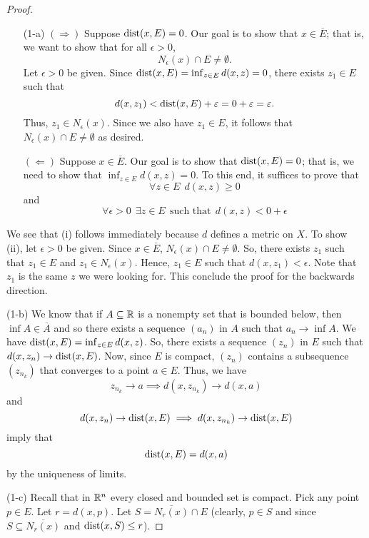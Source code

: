 \documentclass[a4paper]{article}
\begin{document}
\begin{proof}
\begin{enumerate}
    \item[(1-a)]  \( (\Longrightarrow)  \) Suppose \( \operatorname{dist}(x,E) = 0  \). Our goal is to show that \( x \in \overline{E} \); that is, we want to show that for all \( \epsilon > 0  \), 
        \[  {N}_{\epsilon}(x) \cap E \neq \emptyset. \]
        Let \( \epsilon > 0  \) be given. Since \( \operatorname{dist}(x,E) = \inf_{z \in E } d(x,z) = 0  \), there exists \( {z}_{1} \in E  \) such that 
        \[  d(x,{z}_{1}) < \operatorname{dist}(x,E) + \varepsilon = 0 + \varepsilon = \varepsilon.  \]
        Thus, \( {z}_{1} \in {N}_{\epsilon}(x) \). Since we also have \( {z}_{1} \in E  \), it follows that \( {N}_{\epsilon}(x) \cap E \neq \emptyset \) as desired.

        \( (\Longleftarrow) \) Suppose \( x \in \overline{E} \). Our goal is to show that \( \operatorname{dist}(x,E) = 0  \); that is, we need to show that \( \inf_{z \in E } d(x,z) = 0  \). To this end, it suffices to prove that 
        \[  \forall z \in E \ \ d(x,z) \geq 0 \tag{i}  \]
        and
        \[ \forall \epsilon > 0 \ \ \exists z \in E \ \ \text{such that} \ \ d(x,z) < 0 + \epsilon \tag{ii} \]
\end{enumerate}
We see that (i) follows immediately because \( d  \) defines a metric on \( X  \). To show (ii), let \( \epsilon > 0  \) be given. Since \( x \in \overline{E} \), \( {N}_{\epsilon}(x) \cap E \neq \emptyset \). So, there exists \( {z}_{1} \) such that \( {z}_{1} \in E  \) and \( {z}_{1} \in {N}_{\epsilon}(x) \). Hence, \( {z}_{1} \in E  \) such that \( d(x,{z}_{1}) < \epsilon \). Note that \( {z}_{1} \) is the same \( z  \) we were looking for. This conclude the proof for the backwards direction. 

\item[(1-b)] We know that if \( A \subseteq  \mathbb{R}   \) is a nonempty set that is bounded below, then \( \inf A \in \overline{A} \) and so there exists a sequence \( ({a}_{n})  \) in \( A  \) such that \( {a}_{n} \to \inf A  \). We have \( \operatorname{dist}(x,E) = \inf_{z \in E } d(x,z) \). So, there exists a sequence \( ({z}_{n}) \) in \( E  \) such that \( d(x,{z}_{n}) \to \operatorname{dist}(x,E) \). Now, since \( E  \) is compact, \( ({z}_{n}) \) contains a subsequence \( ({z}_{{n}_{k }}) \) that converges to a point \( a \in E  \). Thus, we have 
    \[  {z}_{{n}_{k }} \to a \implies d(x, {z}_{{n}_{k}}) \to d(x,a) \]
    and 
    \[  d(x,{z}_{n}) \to \operatorname{dist}(x,E) \implies d(x,{z}_{{n}_{k}}) \to \operatorname{dist}(x,E) \]
    imply that
    \[  \operatorname{dist}(x,E) = d(x,a) \]
    by the uniqueness of limits.
\item[(1-c)] Recall that in \( \mathbb{R}^{n} \) every closed and bounded set is compact. Pick any point \( p \in E  \). Let \( r = d(x,p) \). Let \( S = \overline{{N}_{r}(x)} \cap E  \) (clearly, \( p \in S  \) and since \( S \subseteq \overline{{N}_{r}(x)}  \) and \( \operatorname{dist}(x,S) \leq r \)).


\end{proof}
\end{document}

